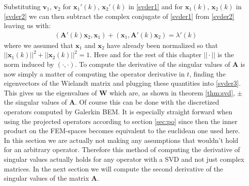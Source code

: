 \documentclass[a4paper, oneside]{discothesis}
\begin{document}
Substituting $\mathbf{v}_1$, $\mathbf{v}_2$ for $\mathbf{x}_1'(k)$, $\mathbf{x}_2'(k)$ in \ref{svder1} and for $\mathbf{x}_1(k)$, $\mathbf{x}_2(k)$ in \ref{svder2} we can then subtract the complex conjugate of \ref{svder1} from \ref{svder2} leaving us with:
\begin{align}
	(\mathbf{A}'(k)\mathbf{x}_2, \mathbf{x}_1) + (\mathbf{x}_1,\mathbf{A}'(k)\mathbf{x}_2) =
	\lambda'(k) 
	\label{svder3}
\end{align}
where we assumed that $\mathbf{x}_1$ and $\mathbf{x}_2$ have already been normalized so that $||\mathbf{x}_1(k)||^2 + ||\mathbf{x}_2(k)||^2 = 1$.
Here and for the rest of this chapter $||\cdot||$ is the norm induced by $(\cdot,\cdot)$.
To compute the derivative of the singular values of $\mathbf{A}$ is now simply a matter of computing the operator derivative in $t$, finding the eigenvectors of the Wielandt matrix and plugging these quantities into \ref{svder3}.
This gives us the eigenvalues of $\mathbf{W}$ which are, as shown in theorem \ref{thm:svd}, $\pm$ the singular values of $\mathbf{A}$.
Of course this can be done with the discretized operators computed by Galerkin BEM.
It is especially straight forward when using the projected operators according to section \ref{sec:po} since then the inner product on the FEM-spaces becomes equivalent to the euclidean one used here.
In this section we are actually not making any assumptions that wouldn't hold for an arbitrary operator.
Therefore this method of computing the derivative of singular values actually holds for any operator with a SVD and not just complex matrices.
In the next section we will compute the second derivative of the singular values of the matrix $\mathbf{A}$.
\end{document}
